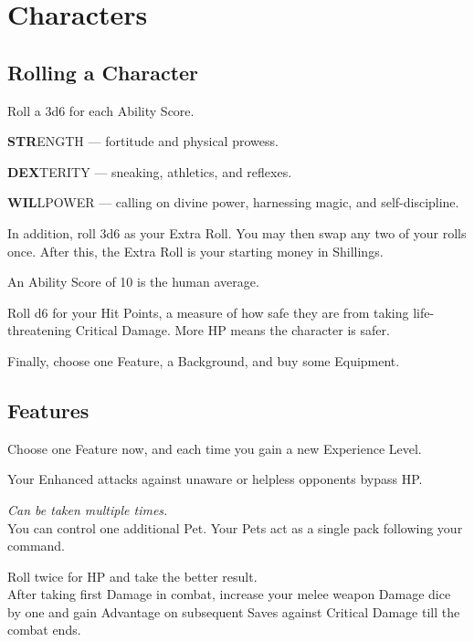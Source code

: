 \documentclass[itdr]{subfiles}
\begin{document}
\chapter{Characters}
\label{ch:characters}

\section{Rolling a Character}

Roll a 3d6 for each Ability Score.

\textbf{STR}ENGTH --- fortitude and physical prowess.

\textbf{DEX}TERITY --- sneaking, athletics, and reflexes.

\textbf{WIL}LPOWER --- calling on divine power, harnessing magic, and self-discipline.

In addition, roll 3d6 as your Extra Roll. You may then swap any two of your rolls once. After this, the Extra Roll is your starting money in Shillings.

An Ability Score of 10 is the human average.

Roll d6 for your Hit Points, a measure of how safe they are from taking life-threatening Critical \mbox{Damage}. More HP means the character is safer.

Finally, choose one Feature, a Background, and buy some Equipment.

\section{Features}

Choose one Feature now, and each time you gain a new Experience Level.

\vfill
{}
Your Enhanced attacks against unaware or helpless opponents bypass HP.

\vfill
{} {\slshape Can be taken multiple times.}\\
You can control one additional Pet. Your Pets act as a single pack following your command.

\vfill
{} Roll twice for HP and take the better result.\\
After taking first Damage in combat, increase your melee weapon Damage dice by one and gain Advantage on subsequent Saves against Critical Damage till the combat ends.
\end{document}
